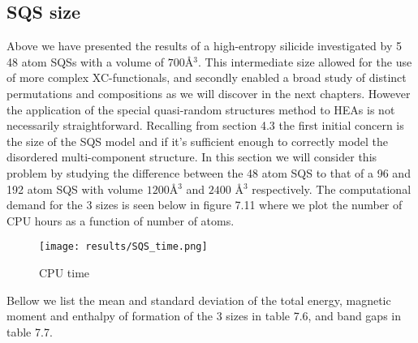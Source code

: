 \newpage
\subsection{SQS size}
Above we have presented the results of a high-entropy silicide  investigated by 5 48 atom SQSs with a volume of $700$\r{A}$^3$. This intermediate size allowed for the use of more complex XC-functionals, and secondly enabled a broad study of distinct permutations and compositions as we will discover in the next chapters. However the application of the special quasi-random structures method to HEAs is not necessarily straightforward. Recalling from section 4.3 the first initial concern is the size of the SQS model and if it's sufficient enough to correctly model the disordered multi-component structure. In this section we will consider this problem by studying the difference between the 48 atom SQS to that of a 96 and 192 atom SQS with volume $1200$\r{A}$^3$ and $2400$ \r{A}$^3$ respectively. The computational demand for the 3 sizes is seen below in figure 7.11 where we plot the number of CPU hours as a function of number of atoms. 

\begin{figure}[H]
\centering
\texttt{[image: results/SQS\_time.png]}
\caption{CPU time}
\end{figure}

Bellow we list the mean and standard deviation of the total energy, magnetic moment and enthalpy of formation of the 3 sizes in table 7.6, and band gaps in table 7.7. 

